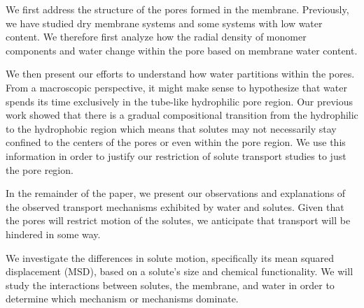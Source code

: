 \documentclass[journal=jpcbfk,manuscript=article]{achemso}
\begin{document}
  We first address the structure of the pores formed in the membrane.
  Previously, we have studied dry membrane systems and some systems with 
  low water content. We therefore first analyze how the radial density of monomer 
  components and water change within the pore based on membrane water content.
  
  We then present our efforts to understand how water partitions within the pores.
  From a macroscopic perspective, it might make sense to hypothesize that water 
  spends its time exclusively in the tube-like hydrophilic pore region. Our
  previous work showed that there is a gradual compositional transition from
  the hydrophilic to the hydrophobic region which means that solutes may not
  necessarily stay confined to the centers of the pores or even within the 
  pore region. 
  We use this information in order to justify our restriction
  of solute transport studies to just the pore region.
  

  In the remainder of the paper, we present our observations 
  and explanations of the observed transport mechanisms exhibited by water
  and solutes. 
Given that the pores will restrict motion of the solutes, we
  anticipate that transport will be hindered in some way. 

  We investigate the differences in solute motion, specifically its mean 
  squared displacement (MSD), based on a solute's size and chemical
  functionality. We will study the interactions between solutes, the membrane,
  and water in order to determine which mechanism or mechanisms dominate.
  
\end{document}
